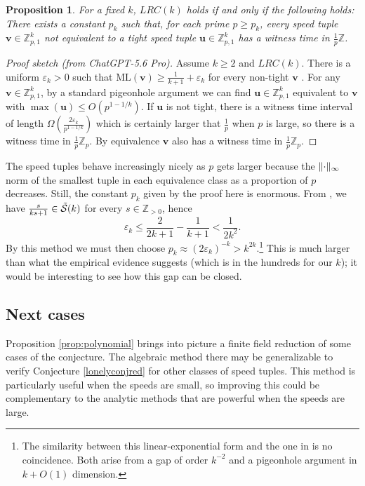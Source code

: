 \documentclass[11pt]{amsart}
\DeclarePairedDelimiter\norm{\lVert}{\rVert}
\newcommand{\Z}{\mathbb{Z}}
\newcommand{\vbf}{\mathbf{v}}
\newcommand{\ubf}{\mathbf{u}}
\newcommand{\ml}{\mathrm{ML}}
\newtheorem{proposition}[theorem]{Proposition}
\theoremstyle{definition}
\theoremstyle{remark}
\begin{document}
\begin{proposition}
\label{prop:lrcimpliestight}
  For a fixed $k$, $LRC(k)$ holds if and only if the following holds: There exists a constant $p_k$ such that, for each prime $p\geq p_k$, 
  every speed tuple $\vbf\in\Z_{p,1}^k$ not equivalent to a tight speed tuple $\ubf\in\Z_{p,1}^k$ has a witness time in $\frac{1}{p}\Z$.
\end{proposition}
\begin{proof}[Proof sketch (from ChatGPT-5.6 Pro)]
    Assume $k\geq2$ and $LRC(k)$. There is a uniform $\varepsilon_k>0$ such that $\ml(\vbf)\geq\frac{1}{k+1}+\varepsilon_k$ for every non-tight $\vbf$ \cite[Theorem 1.4]{giri_structure_2026}. For any $\vbf\in\Z_{p,1}^k$, by a standard pigeonhole argument we can find $\ubf\in\Z_{p,1}^k$ equivalent to $\vbf$ with $\max(\ubf)\leq O(p^{1-1/k})$. If $\ubf$ is not tight, there is a witness time interval of length $\Omega(\frac{2\varepsilon_k}{p^{1-1/k}})$ which is certainly larger that $\frac{1}{p}$ when $p$ is large, so there is a witness time in $\frac{1}{p}\Z_p$. By equivalence $\vbf$ also has a witness time in $\frac{1}{p}\Z_p$.
\end{proof}
The speed tuples behave increasingly nicely as $p$ gets larger because 
the $\norm{\cdot}_\infty$ norm of the smallest tuple in each equivalence class as a proportion of $p$ decreases. Still, the constant $p_k$ given by the proof here is enormous. 
From \cite[Theorem 3.1]{kravitz2021barely}, we have $\frac{s}{ks+1}\in\mathcal{\Tilde{S}}(k)$ for every $s\in\Z_{>0}$, hence
\[\varepsilon_k\leq\frac{2}{2k+1}-\frac{1}{k+1}<\frac{1}{2k^2}.\] 
By this method we must then choose $p_k\approx(2\varepsilon_k)^{-k}>k^{2k}$.\footnote{The similarity between this linear-exponential form and the one in \cite[Theorem A]{Malikiosis} is no coincidence. Both arise from a gap of order $k^{-2}$ and a pigeonhole argument in $k+O(1)$ dimension.} 
This is much larger than what the empirical evidence suggests (which is in the hundreds for our $k$); it would be interesting to see how this gap can be closed.

\subsection{Next cases}
Proposition \ref{prop:polynomial} brings into picture a finite field reduction of some cases of the conjecture. 
The algebraic method there may be generalizable to verify Conjecture \ref{lonelyconjred} for other classes of speed tuples. 
This method is particularly useful when the speeds are small, so improving this could be complementary to the analytic methods that are powerful when the speeds are large.
\end{document}
